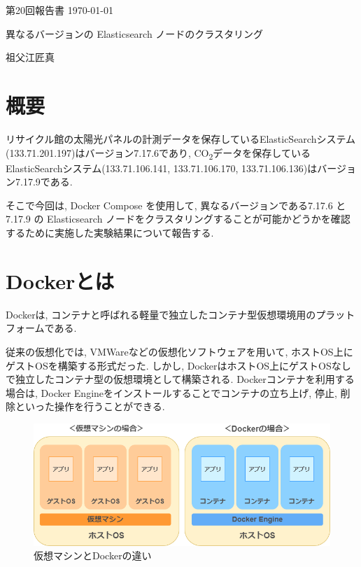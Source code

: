 \documentclass[a4j,12pt,]{jarticle}
\begin{document}
{\noindent\small 第20回報告書 \hfill\today}
\begin{center}
  {\Large 異なるバージョンの Elasticsearch ノードのクラスタリング}
\end{center}
\begin{flushright}
  祖父江匠真 \\
\end{flushright}

\section{概要}
リサイクル館の太陽光パネルの計測データを保存しているElasticSearchシステム(133.71.201.197)はバージョン7.17.6であり, CO\textsubscript{2}データを保存しているElasticSearchシステム(133.71.106.141, 133.71.106.170, 133.71.106.136)はバージョン7.17.9である.

そこで今回は, Docker Compose を使用して, 異なるバージョンである7.17.6 と 7.17.9 の Elasticsearch ノードをクラスタリングすることが可能かどうかを確認するために実施した実験結果について報告する.

\section{Dockerとは}
Dockerは, コンテナと呼ばれる軽量で独立したコンテナ型仮想環境用のプラットフォームである.

従来の仮想化では, VMWareなどの仮想化ソフトウェアを用いて, ホストOS上にゲストOSを構築する形式だった.
しかし, DockerはホストOS上にゲストOSなしで独立したコンテナ型の仮想環境として構築される.
Dockerコンテナを利用する場合は, Docker Engineをインストールすることでコンテナの立ち上げ, 停止, 削除といった操作を行うことができる.

\begin{figure}[H]
  \begin{center}
    \includegraphics[width=160mm]{docker-vmware.png}
    \caption{仮想マシンとDockerの違い}
    \label{p0}
  \end{center}
\end{figure}
\end{document}
